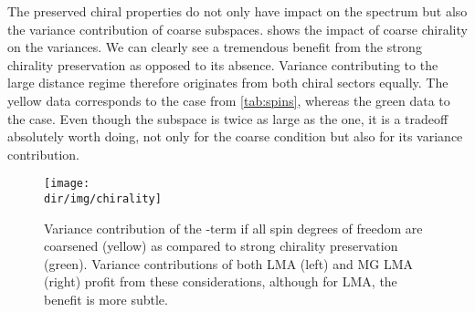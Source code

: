 The preserved chiral properties do not only have impact on the spectrum but also the variance contribution of coarse subspaces.
 shows the impact of coarse chirality on the variances.
We can clearly see a tremendous benefit from the strong chirality preservation as opposed to its absence.
Variance contributing to the large distance regime therefore originates from both chiral sectors equally.
The yellow data corresponds to the  case from \cref{tab:spins}, whereas the green data to the  case.
Even though the  subspace is twice as large as the  one, it is a tradeoff absolutely worth doing, not only for the coarse condition but also for its variance contribution.
\begin{figure}
\centering
\texttt{[image: \\dir/img/chirality]}
\caption{
Variance contribution of the -term if all spin degrees of freedom are coarsened  (yellow) as compared to strong chirality preservation  (green).
Variance contributions of both LMA (left) and MG LMA (right) profit from these considerations, although for LMA, the benefit is more subtle.
\takenfull
}
\label{fig:chirality:variance}
\end{figure}






